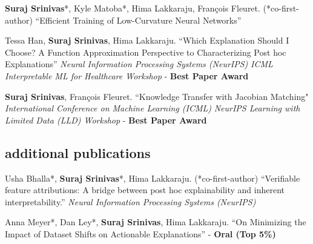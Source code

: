 \documentclass[11pt, a4paper, english]{moderncv}        %
\newcommand{\cvsection}[1]{\vspace{0.3cm}\subsection{\Large{{#1}}}}
\begin{document}
 {\textbf{Suraj Srinivas}*, Kyle Matoba*, Hima Lakkaraju, Fran\c{c}ois Fleuret. (*co-first-author) \newline ``Efficient Training of Low-Curvature Neural Networks'' 
}\vspace*{0.25em}

 {Tessa Han, \textbf{Suraj Srinivas}, Hima Lakkaraju. 
\newline ``Which Explanation Should I Choose? A Function Approximation Perspective to Characterizing Post hoc Explanations''
\newline \textit{Neural Information Processing Systems (NeurIPS)} \newline \textit{ICML Interpretable ML for Healthcare Workshop} - \textbf{Best Paper Award}}
\vspace*{0.25em}

\vspace*{0.25em}

 {\textbf{Suraj Srinivas}, Fran\c{c}ois Fleuret.
\newline ``Knowledge Transfer with Jacobian Matching" 
\newline \textit{International Conference on Machine Learning (ICML)}
\newline \textit{NeurIPS Learning with Limited Data (LLD) Workshop} - \textbf{Best Paper Award}
}
\vspace*{0.25em}

\cvsection{additional publications}
\vspace{0.1cm}
 {Usha Bhalla*, \textbf{Suraj Srinivas}*, Hima Lakkaraju. (*co-first-author) \newline ``Verifiable feature attributions: A bridge between post hoc explainability and inherent interpretability.'' 
\newline \textit{Neural Information Processing Systems (NeurIPS)}}
\vspace*{0.25em}

 {Anna Meyer*, Dan Ley*, \textbf{Suraj Srinivas}, Hima Lakkaraju. \newline ``On Minimizing the Impact of Dataset Shifts on Actionable Explanations''  - \textbf{Oral (Top 5\%)}
}
\vspace*{0.25em}
\end{document}

